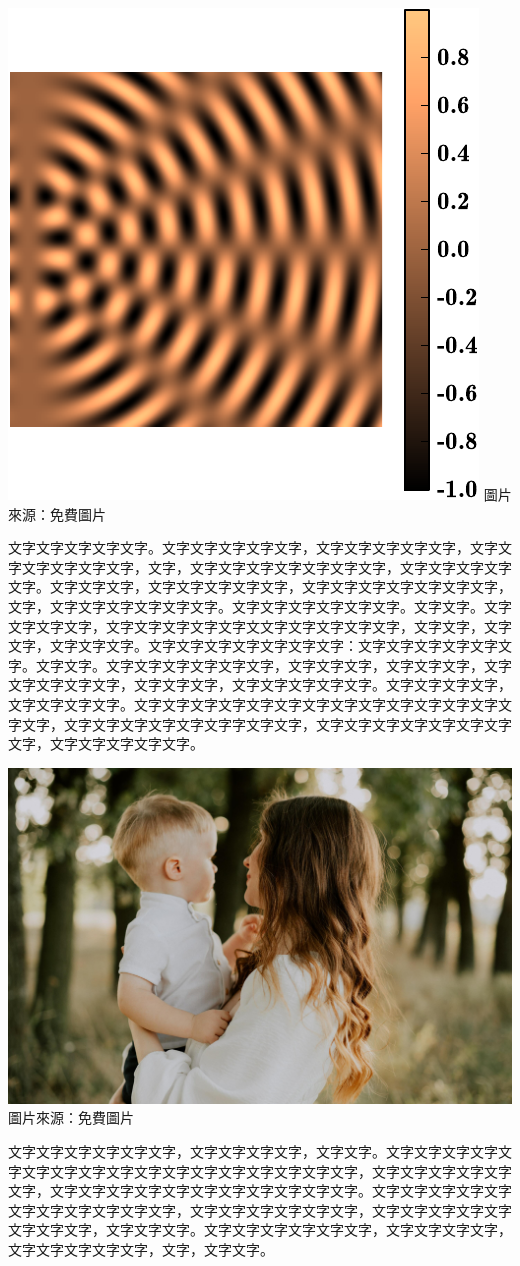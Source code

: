 \documentclass[12pt]{article}
\begin{document}
{\includegraphics[width=.4\linewidth]{watertank}}
{圖片來源：免費圖片\autocite{unsplash}}

文字文字文字文字文字。文字文字文字文字文字，文字文字文字文字文字，文字文字文字文字文字文字，文字，文字文字文字文字文字文字文字，文字文字文字文字文字。文字文字文字，文字文字文字文字文字，文字文字文字文字文字文字文字，文字，文字文字文字文字文字文字。文字文字文字文字文字文字。文字文字。文字文字文字文字，文字文字文字文字文字文文字文字文字文字文字，文字文字，文字文字，文字文字文字。文字文字文字文字文字文字文字：文字文字文字文字文字文字。文字文字。文字文字文字文字文字文字，文字文字文字，文字文字文字，文字文字文字文字文字，文字文字文字，文字文字文字文字文字。文字文字文字文字，文字文字文字文字。文字文字文字文字文字文字文字文字文字文字文字文字文字文字文字，文字文字文字文字文字文字字文字文字，文字文字文字文字文字文字文字文字，文字文字文字文字文字。

{\includegraphics[width=.5\linewidth]{katerREDU.jpg}}
{圖片來源：免費圖片\autocite{unsplash}}

文字文字文字文字文字文字，文字文字文字文字，文字文字。文字文字文字文字文字文字文字文字文字文字文字文字文字文字文字文字文字，文字文字文字文字文字文字，文字文字文字文字文字文字文字文字文字文字文字。文字文字文字文字文字文字文字文字文字文字文字，文字文字文字文字文字文字，文字文字文字文字文字文字文字文字，文字文字文字。文字文字文字文字文字文字，文字文字文字文字，文字文字文字文字文字，文字，文字文字。
\end{document}
